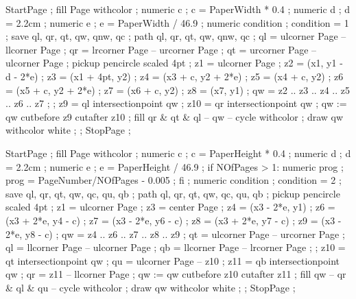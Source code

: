 
\NormalHeight        {\textheight}
\PictureFrameHeight  {\textheight}




\setupcolors[textcolor=simpleslides:textcolor]


StartPage ;
fill Page withcolor  ;
numeric c ; c = PaperWidth * 0.4 ;
numeric d ; d = 2.2cm ;
numeric e ; e = PaperWidth / 46.9 ;
numeric condition ; condition = 1 ;
save ql, qr, qt, qw, qnw, qc ; path ql, qr, qt, qw, qnw, qc ;
ql = ulcorner Page -- llcorner Page ;
qr = lrcorner Page -- urcorner Page ;
qt = urcorner Page -- ulcorner Page ;
pickup pencircle scaled 4pt ;
z1 = ulcorner Page ;
z2 = (x1, y1 - d - 2*e) ;
z3 = (x1 + 4pt, y2) ;
z4 = (x3 + c, y2 + 2*e) ;
z5 = (x4 + c, y2) ;
z6 = (x5 + c, y2 + 2*e) ;
z7 = (x6 + c, y2) ;
z8 = (x7, y1) ;
qw = z2 .. z3 .. z4 .. z5 .. z6 .. z7 ;
 ;
z9 = ql intersectionpoint qw ;
z10 = qr intersectionpoint qw ;
qw := qw cutbefore z9 cutafter z10 ;
fill qr & qt & ql -- qw -- cycle withcolor  ; 
draw qw withcolor white ;
 ;
StopPage ;
\stopuseMPgraphic 

StartPage ;
fill Page withcolor  ;
numeric c ; c = PaperHeight * 0.4 ;
numeric d ; d = 2.2cm ;
numeric e ; e = PaperHeight / 46.9 ;
if NOfPages > 1:
  numeric prog ; prog = PageNumber/NOfPages - 0.005 ;
fi ;
numeric condition ; condition = 2 ;
save ql, qr, qt, qw, qc, qu, qb ; path ql, qr, qt, qw, qc, qu, qb ;
pickup pencircle scaled 4pt ;
z1 = ulcorner Page ;
z3 = center Page ;
z4 = (x3 - 2*e, y1) ;
z6 = (x3 + 2*e, y4 - c) ;
z7 = (x3 - 2*e, y6 - c) ;
z8 = (x3 + 2*e, y7 - c) ;
z9 = (x3 - 2*e, y8 - c) ;
qw = z4 .. z6 .. z7 .. z8 .. z9 ;
qt = ulcorner Page -- urcorner Page ;
ql = llcorner Page -- ulcorner Page ;
qb = llcorner Page -- lrcorner Page ;
 ;
z10 = qt intersectionpoint qw ;
qu = ulcorner Page -- z10 ;
z11 = qb intersectionpoint qw ;
qr = z11 -- llcorner Page ;
qw := qw cutbefore z10 cutafter z11 ;
fill qw -- qr & ql & qu -- cycle withcolor  ;
draw qw withcolor white ;
 ;
StopPage ;
\stopuseMPgraphic 

